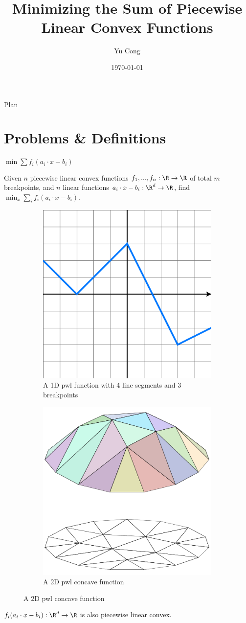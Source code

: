 \documentclass{beamer}
\author{Yu Cong}
\title[Minimizing sum of pwl convex function]{Minimizing the Sum of Piecewise Linear Convex Functions}
\date{\today}
\begin{document}
\begin{frame}[plain]
    \titlepage
\end{frame}

\begin{frame}[plain]{Plan}
    \tableofcontents
\end{frame}

\section{Problems \& Definitions}
\begin{frame}{$\min \sum f_i(a_i\cdot x-b_i)$}
\begin{problem}
    Given $n$ piecewise linear convex functions $f_1,...,f_n:\R \to \R$ of total $m$ breakpoints, and $n$ linear functions $a_i\cdot x-b_i:\R^d\to \R$, find $\min_x \sum_i f_i(a_i\cdot x-b_i)$.
\end{problem}
\begin{figure}
    \centering
    \begin{subfigure}{.5\textwidth}
      \centering
      \includegraphics[width=.4\linewidth]{images/Piecewise_linear_function.svg.png}
      \caption{A 1D pwl function with 4 line segments and 3 breakpoints}
      \label{fig:sub1}
    \end{subfigure}%
    \begin{subfigure}{.5\textwidth}
      \centering
      \includegraphics[width=.4\linewidth]{images/Piecewise_linear_function2D.png}
      \caption{A 2D pwl concave function}
      \label{fig:sub2}
    \end{subfigure}
    \label{fig:1}
    \end{figure}
    $f_i(a_i\cdot x-b_i):\R^d\to \R$ is also piecewise linear convex.
\end{frame}
\end{document}
